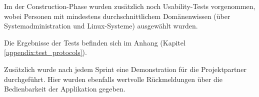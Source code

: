 Im der Construction-Phase wurden zusätzlich noch Usability-Tests vorgenommen, wobei Personen mit mindestens durchschnittlichem Domänenwissen (über Systemadministration und Linux-Systeme) ausgewählt wurden.

Die Ergebnisse der Tests befinden sich im Anhang (Kapitel \ref{appendix:test_protocols}).

Zusätzlich wurde nach jedem Sprint eine Demonstration für die Projektpartner durchgeführt. Hier wurden ebenfalls wertvolle Rückmeldungen über die Bedienbarkeit der Applikation gegeben.